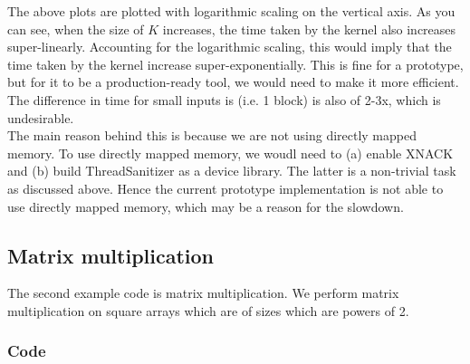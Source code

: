 \documentclass{btp}
\begin{document}
The above plots are plotted with logarithmic scaling on the vertical axis. As you can see, when the size of $K$ increases, the time taken by the kernel also increases super-linearly. Accounting for the logarithmic scaling, this would imply that the time taken by the kernel increase super-exponentially. This is fine for a prototype, but for it to be a production-ready tool, we would need to make it more efficient. The difference in time for small inputs is (i.e. 1 block) is also of 2-3x, which is undesirable.
\\
\newline
The main reason behind this is because we are not using directly mapped memory. To use directly mapped memory, we woudl need to (a) enable XNACK and (b) build ThreadSanitizer as a device library. The latter is a non-trivial task as discussed above. Hence the current prototype implementation is not able to use directly mapped memory, which may be a reason for the slowdown.

\subsection{Matrix multiplication}

The second example code is matrix multiplication. We perform matrix multiplication on square arrays which are of sizes which are powers of 2.

\subsubsection{Code}
\end{document}
